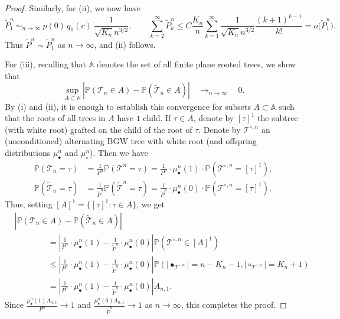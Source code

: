 \documentclass[10pt]{amsart}
\theoremstyle{definition}\newtheorem{defi}[theo]{Definition}\newtheorem{rema}[theo]{Remark}\newtheorem{exam}[theo]{Example}\newtheorem{exem}[theo]{Example}\newtheorem{nota}[theo]{Notation}
\providecommand{\abs}[1]{\lvert#1\rvert}
\def\mubn{\mu_{\bullet}^{n}}
\def\mucn{\mu_{\circ}^{n}}
\def\tTs{\tilde{\Ts}}
\def\Ts{\mathscr{T}}
\renewcommand\Pr[1]{\mathbb{P}\left(#1\right)}
\begin{document}
\begin{proof}
Similarly, for (ii), we now have
\[ \tilde{P}^{n}_{1}  \ \mathop{\sim}_{n \rightarrow \infty} \
{ p(0)\, q_{1}(c)}\ \frac{1}{\sqrt{K_{n}} n^{3/2}}, \qquad \sum_{k=2}^{\infty} \tilde{P}^{n}_{k} \leq C  \frac{K_{n}}{n}\sum_{k=1}^{\infty}\frac{1}{\sqrt{K_{n}} n^{3/2}}  \frac{(k+1)^{k-1}}{k!}= o\big( \tilde{P}^{n}_{1} \big).\]
Thus $\tilde{P}^{n} \sim \tilde{P}^{n}_{1}$ as $n \rightarrow \infty$, and (ii) follows.


For (iii), recalling that $\mathbb{A}$ denotes the set of all finite plane rooted trees, we show that
\begin{equation}
\label{eq:dtv}\sup_{A \subset \mathbb{A}} \left| \Pr{\Ts_{n} \in A} -  \Pr{\tilde{\Ts}_{n} \in A}\right|   \quad \mathop{\longrightarrow}_{n \rightarrow \infty} \quad  0.
\end{equation}
By (i) and (ii), it is enough to establish this convergence for subsets $A \subset \mathbb{A}$ such that the roots of all trees in $A$ have $1$ child.
If $\tau \in A$, denote by $[\tau]^{1}$ the subtree (with white root) grafted on the child of the root of $\tau$.
Denote by $\Ts^{\circ,n}$  an (unconditioned) alternating BGW tree with white root (and offspring distributions
$\mubn$ and $\mucn$). Then we have
\begin{align*}
  \Pr{ \Ts_{n}=\tau}&= \frac{1}{P^{n}} \Pr{ \Ts^{n}=\tau} = \frac{1}{P^{n}} \cdot \mubn(1) \cdot \Pr{ \Ts^{\circ,n}=[\tau]^{1}},\\
  \Pr{ \tTs_{n}=\tau}&= \frac{1}{\tilde{P}^{n}} \Pr{ \tTs^{n}=\tau} = \frac{1}{\tilde{P}^{n}} \cdot \mubn(0) \cdot \Pr{ \Ts^{\circ,n}=[\tau]^{1} }.
\end{align*}
Thus, setting $[A]^{1}= \{[\tau]^{1} : \tau \in A\}$, we get
\begin{align*}
&\left| \Pr{\Ts_{n} \in A} -  \Pr{\tilde{\Ts}_{n} \in A}\right| \\
& \qquad  \qquad = \left| \frac{1}{P^{n}} \cdot \mubn(1)- \frac{1}{\tilde{P}^{n}} \cdot \mubn(0) \right| \Pr{ \Ts^{\circ,n}  \in [A]^{1}}\\
& \qquad \qquad \leq \left| \frac{1}{P^{n}} \cdot \mubn(1)- \frac{1}{\tilde{P}^{n}} \cdot \mubn(0) \right|  \Pr{\abs{\bullet_{\Ts^{\circ,n}}}=n-K_{n}-1, \abs{\circ_{\Ts^{\circ,n}}}=K_{n}+1} \\
& \qquad \qquad = \left| \frac{1}{P^{n}} \cdot \mubn(1)- \frac{1}{\tilde{P}^{n}} \cdot \mubn(0) \right|  A_{n,1}.
\end{align*}
Since $\tfrac{\mubn(1) A_{n,1}}{P^{n}} \rightarrow 1$ and $\tfrac{\mubn(0) A_{n,1}}{\tilde{P}^{n}} \rightarrow 1$ as $n \rightarrow \infty$, this completes the proof.
\end{proof}
\end{document}
